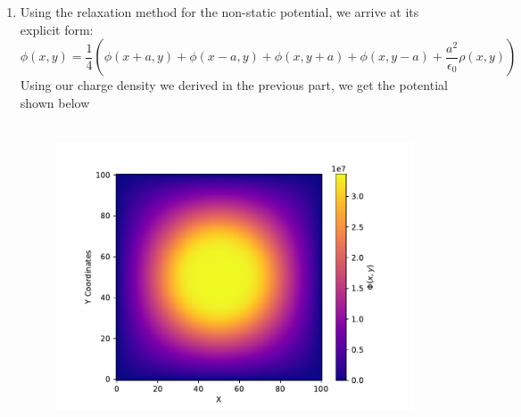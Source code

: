 \documentclass{article}
\begin{document}
\begin{enumerate}
{\begin{enumerate}
{\begin{figure}[tp]
            \label{fig:my_label}
        \end{figure}
        Luckily, we can simply loop over the particles in a cell and assign charge densities to their neighbors. Since our cell center is located at $\pmb{r}_c = \frac{1}{2}\pmb{r}_p$, we write the relative distance between the particles and the center of the cell as $dr \sim r_p - r_c$. With this, we define a new parameter $t_r := 1- dr$. Doing so allows us to write the density grid values as a linear interpolation
        \begin{equation*}
            \begin{split}
                \rho_{i, j} &= \rho_{i,j} + m_pt_r\\
                \rho_{i+1, j} &= \rho_{i+1,j} + m_pt_r\\
                \vdots\\
                \rho_{i+1, j+1} &= \rho_{i+1, j+1} + m_pt_r
            \end{split}
        \end{equation*}
        Using this method, we arrive at the density plot for this data set.
        }
        \item{Using the relaxation method for the non-static potential, we arrive at its explicit form:
        \begin{equation*}
            \phi(x,y) = \frac{1}{4}(\phi(x+a,y) + \phi(x-a,y) + \phi(x,y+a) + \phi(x,y-a) + \frac{a^2}{\epsilon_0}\rho(x,y))
        \end{equation*}
        Using our charge density we derived in the previous part, we get the potential shown below
        \begin{figure}[tp]
            \centering
            \includegraphics[width=\textwidth, height=9cm]{relaxed_potential_field.pdf}

\end{figure}}
\end{enumerate}}
\end{enumerate}
\end{document}
